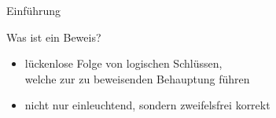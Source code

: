 %
%
%
%

\begin{frame}{Einführung}
\begin{alertblock}{Was ist ein Beweis?}
\begin{itemize}
        \item lückenlose Folge von logischen Schlüssen,\\welche zur zu beweisenden Behauptung führen
        \item nicht nur einleuchtend, sondern zweifelsfrei korrekt
    \end{itemize}
\end{alertblock}
\end{frame}

